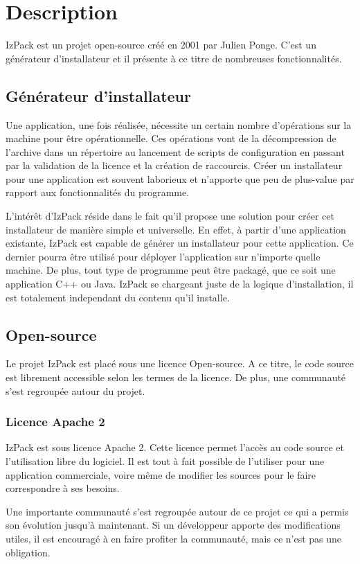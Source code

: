 \section{Description}
IzPack est un projet open-source créé en 2001 par Julien Ponge. C'est un générateur d'installateur et il présente à ce titre de nombreuses fonctionnalités.
\subsection{Générateur d'installateur}
Une application, une fois réalisée, nécessite un certain nombre d'opérations sur la machine pour être opérationnelle.
Ces opérations vont de la décompression de l'archive dans un répertoire au lancement de scripts de configuration en passant par la validation de la licence et la création de raccourcis.
Créer un installateur pour une application est souvent laborieux et n'apporte que peu de plus-value par rapport aux fonctionnalités du programme.

L'intérêt d'IzPack réside dans le fait qu'il propose une solution pour créer cet installateur de manière simple et universelle.
En effet, à partir d'une application existante, IzPack est capable de générer un installateur pour cette application.
Ce dernier pourra être utilisé pour déployer l'application sur n'importe quelle machine.
De plus, tout type de programme peut être packagé, que ce soit une application C++ ou Java. IzPack se chargeant juste de la logique d'installation, il est totalement independant du contenu qu'il installe.
\subsection{Open-source}
Le projet IzPack est placé sous une licence Open-source. A ce titre, le code source est librement accessible selon les termes de la licence. De plus, une communauté s'est regroupée autour du projet.
\subsubsection{Licence Apache 2}
IzPack est sous licence Apache 2. Cette licence permet l'accès au code source et l'utilisation libre du logiciel.
Il est tout à fait possible de l'utiliser pour une application commerciale, voire même de modifier les sources pour le faire correspondre à ses besoins.

Une importante communauté s'est regroupée autour de ce projet ce qui a permis son évolution jusqu'à maintenant.
Si un développeur apporte des modifications utiles, il est encouragé à en faire profiter la communauté, mais ce n'est pas une obligation.
